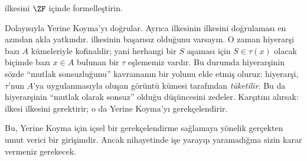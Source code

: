 \begin{prob}
	\stagescofin{} ilkesini $\ZF$ içinde formelleştirin.
\end{prob}

Dolayısıyla \stagescofin{} Yerine Koyma'yı doğrular. Ayrıca
\stagesinex{} ilkesinin \stagescofin{} ilkesini doğrulaması en azından akla
yatkındır. \stagescofin{} ilkesinin başarısız olduğunu varsayın. O zaman
hiyerarşi bazı $A$ kümeleriyle kofinaldir; yani herhangi bir $S$ aşaması için
$S \in \tau(x)$ olacak biçimde bazı $x \in A$ bulunan bir $\tau$ eşlememiz
vardır. Bu durumda hiyerarşinin sözde ``mutlak sonsuzluğunu'' kavramanın bir
yolunu elde etmiş oluruz: hiyerarşi, $\tau$'nun $A$'ya uygulanmasıyla oluşan
görüntü kümesi tarafından \emph{tüketilir}. Bu da hiyerarşinin ``mutlak
olarak sonsuz'' olduğu düşüncesini zedeler. Karşıtını alırsak:
\stagesinex{} ilkesi \stagescofin{} ilkesini gerektirir; o da Yerine
Koyma'yı gerekçelendirir.

Bu, Yerine Koyma için içsel bir gerekçelendirme sağlamaya yönelik gerçekten
umut verici bir girişimdir. Ancak nihayetinde işe yarayıp yaramadığına sizin
karar vermeniz gerekecek.

